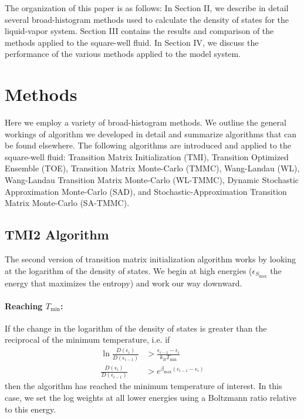\documentclass[letterpaper,twocolumn,amsmath,amssymb,pre,aps,10pt]{revtex4-1}
\begin{document}
The organization of this paper is as follows: In Section II, we
describe in detail several broad-histogram methods used to calculate
the density of states for the liquid-vapor system.  Section III
contains the results and comparison of the methods applied to the
square-well fluid.  In Section IV, we discuss the performance of the
various methods applied to the model system.


\section{Methods}

Here we employ a variety of broad-histogram methods.  We outline the
general workings of algorithm we developed in detail and summarize
algorithms that can be found elsewhere.  The following algorithms are
introduced and applied to the square-well fluid: Transition Matrix
Initialization (TMI), Transition Optimized Ensemble (TOE), Transition
Matrix Monte-Carlo (TMMC), Wang-Landau (WL), Wang-Landau Transition
Matrix Monte-Carlo (WL-TMMC), Dynamic Stochastic Approximation
Monte-Carlo (SAD), and Stochastic-Approximation Transition Matrix
Monte-Carlo (SA-TMMC).

\subsection{TMI2 Algorithm}

The second version of transition matrix initialization algorithm works
by looking at the logarithm of the density of states.  We begin at
high energies ($\epsilon_{S_{\max}}$ the energy that maximizes the entropy) and work our way
downward.

\paragraph{Reaching $T_{\min}$:}
If the change in the logarithm of the density of states is greater
than the reciprocal of the minimum temperature, i.e. if
\begin{align}
  \ln\frac{D(\epsilon_i)}{D(\epsilon_{i-1})} &>
  \frac{\epsilon_{i-1} - \epsilon_i}{k_BT_{\min}}
  \\
  \frac{D(\epsilon_i)}{D(\epsilon_{i-1})} &>
  e^{\beta_{\max}(\epsilon_{i-1} - \epsilon_i)}
\end{align}
then the algorithm has reached the minimum temperature of interest.
In this case, we set the log weights at all lower energies using a
Boltzmann ratio relative to this energy.
\end{document}
